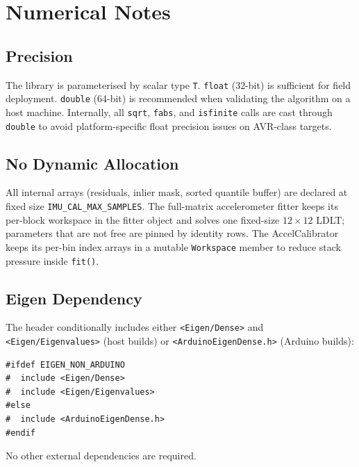 \documentclass[conference]{IEEEtran}
\begin{document}
    \section{Numerical Notes}
    \label{sec:numerical}

    \subsection{Precision}

    The library is parameterised by scalar type \texttt{T}.
    \texttt{float} (32-bit) is sufficient for field deployment.
    \texttt{double} (64-bit) is recommended when validating the algorithm
    on a host machine.
    Internally, all \texttt{sqrt}, \texttt{fabs}, and \texttt{isfinite}
    calls are cast through \texttt{double} to avoid platform-specific
    float precision issues on AVR-class targets.

    \subsection{No Dynamic Allocation}

    All internal arrays (residuals, inlier mask, sorted quantile buffer)
    are declared at fixed size \texttt{IMU\_CAL\_MAX\_SAMPLES}.
    The full-matrix accelerometer fitter keeps its per-block workspace in the
    fitter object and solves one fixed-size $12\times12$ LDLT; parameters
    that are not free are pinned by identity rows.
    The AccelCalibrator keeps its per-bin index arrays in a mutable
    \texttt{Workspace} member to reduce stack pressure inside \texttt{fit()}.

    \subsection{Eigen Dependency}

    The header conditionally includes either \texttt{<Eigen/Dense>} and
    \texttt{<Eigen/Eigenvalues>} (host builds) or
    \texttt{<ArduinoEigenDense.h>} (Arduino builds):
    \begin{lstlisting}
#ifdef EIGEN_NON_ARDUINO
#  include <Eigen/Dense>
#  include <Eigen/Eigenvalues>
#else
#  include <ArduinoEigenDense.h>
#endif
    \end{lstlisting}
    No other external dependencies are required.

\end{document}
